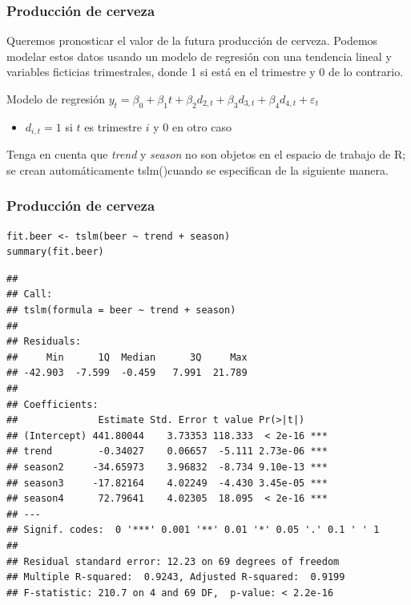 \documentclass[10pt]{beamer}
\begin{document}





\begin{frame}[fragile]
\frametitle{Producción de cerveza}


Queremos pronosticar el valor de la futura producción de cerveza. Podemos modelar estos datos usando un modelo de regresión con una tendencia lineal y variables ficticias trimestrales, donde 1 si está en el trimestre y 0 de lo contrario.

\vspace{3mm}

\begin{block}{Modelo de regresión}
$y_t = \beta_0 + \beta_1 t + \beta_2d_{2,t} + \beta_3 d_{3,t} + \beta_4 d_{4,t} + \varepsilon_t$
\end{block}



\begin{itemize}
\item $d_{i,t} = 1$ si $t$ es trimestre $i$ y $0$ en otro caso
\end{itemize}

\vspace{4mm}
\pause
Tenga en cuenta que \textit{trend} y \textit{season} no son objetos en el espacio de trabajo de R; se crean automáticamente tslm()cuando se especifican de la siguiente manera.


\end{frame}







\begin{frame}[fragile]
\frametitle{Producción de cerveza}


\lstset{language=r,label= ,caption= ,captionpos=b,numbers=none}
\begin{lstlisting}
fit.beer <- tslm(beer ~ trend + season)
summary(fit.beer)
\end{lstlisting}

\pause
{\scriptsize
\begin{verbatim}
## 
## Call:
## tslm(formula = beer ~ trend + season)
## 
## Residuals:
##     Min      1Q  Median      3Q     Max 
## -42.903  -7.599  -0.459   7.991  21.789 
## 
## Coefficients:
##              Estimate Std. Error t value Pr(>|t|)    
## (Intercept) 441.80044    3.73353 118.333  < 2e-16 ***
## trend        -0.34027    0.06657  -5.111 2.73e-06 ***
## season2     -34.65973    3.96832  -8.734 9.10e-13 ***
## season3     -17.82164    4.02249  -4.430 3.45e-05 ***
## season4      72.79641    4.02305  18.095  < 2e-16 ***
## ---
## Signif. codes:  0 '***' 0.001 '**' 0.01 '*' 0.05 '.' 0.1 ' ' 1
## 
## Residual standard error: 12.23 on 69 degrees of freedom
## Multiple R-squared:  0.9243, Adjusted R-squared:  0.9199 
## F-statistic: 210.7 on 4 and 69 DF,  p-value: < 2.2e-16
\end{verbatim}
}


\end{frame}
\end{document}
